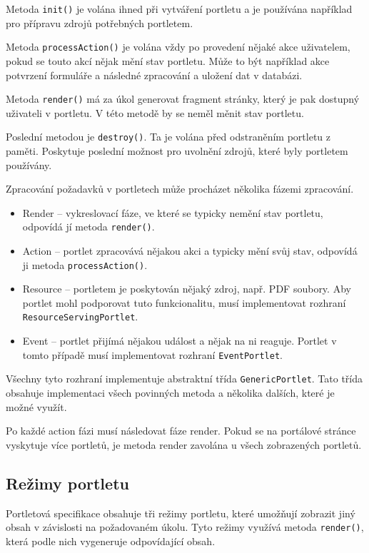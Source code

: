 \documentclass{fithesis}
\begin{document}
Metoda \verb|init()| je volána ihned při vytváření portletu a je používána například pro přípravu zdrojů potřebných portletem.

Metoda \verb|processAction()| je volána vždy po provedení nějaké akce uživatelem, pokud se touto akcí nějak mění stav portletu. Může to být například akce potvrzení formuláře a následné zpracování a uložení dat v databázi.

Metoda \verb|render()| má za úkol generovat fragment stránky, který je pak dostupný uživateli v portletu. V této metodě by se neměl měnit stav portletu.

Poslední metodou je \verb|destroy()|. Ta je volána před odstraněním portletu z paměti. Poskytuje poslední možnost pro uvolnění zdrojů, které byly portletem používány. \cite{jsr-286}

Zpracování požadavků v portletech může procházet několika fázemi zpracování.

\begin{itemize}
\item Render -- vykreslovací fáze, ve které se typicky nemění stav portletu, odpovídá jí metoda \verb|render()|.
\item Action -- portlet zpracovává nějakou akci a typicky mění svůj stav, odpovídá ji metoda \verb|processAction()|.
\item Resource -- portletem je poskytován nějaký zdroj, např. PDF soubory. Aby portlet mohl podporovat tuto funkcionalitu, musí implementovat rozhraní \verb|ResourceServingPortlet|.
\item Event -- portlet přijímá nějakou událost a nějak na ni reaguje. Portlet v tomto případě musí implementovat rozhraní \verb|EventPortlet|.
\end{itemize}

Všechny tyto rozhraní implementuje abstraktní třída \verb|GenericPortlet|. Tato třída obsahuje implementaci všech povinných metoda a několika dalších, které je možné využít.

Po každé action fázi musí následovat fáze render. Pokud se na portálové stránce vyskytuje více portletů, je metoda render zavolána u všech zobrazených portletů. 

\subsection{Režimy portletu}
Portletová specifikace obsahuje tři režimy portletu, které umožňují zobrazit jiný obsah v závislosti na požadovaném úkolu. Tyto režimy využívá metoda \verb|render()|, která podle nich vygeneruje odpovídající obsah.
\end{document}
